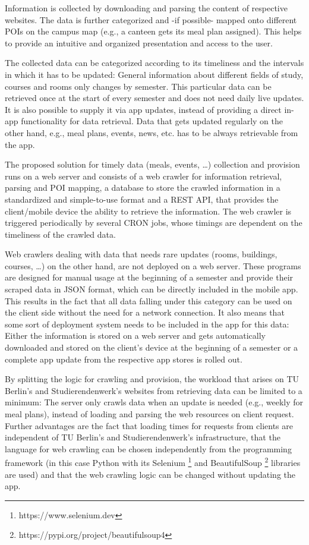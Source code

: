 Information is collected by downloading and parsing the content of respective websites. The data is further categorized and -if possible- mapped onto different POIs on the campus map (e.g., a canteen gets its meal plan assigned). This helps to provide an intuitive and organized presentation and access to the user.

The collected data can be categorized according to its timeliness and the intervals in which it has to be updated: General information about different fields of study, courses and rooms only changes by semester. This particular data can be retrieved once at the start of every semester and does not need daily live updates. It is also possible to supply it via app updates, instead of providing a direct in-app functionality for data retrieval. Data that gets updated regularly on the other hand, e.g., meal plans, events, news, etc. has to be always retrievable from the app.

The proposed solution for timely data (meals, events, \ldots) collection and provision runs on a web server and consists of a web crawler for information retrieval, parsing and POI mapping, a database to store the crawled information in a standardized and simple-to-use format and a REST API, that provides the client/mobile device the ability to retrieve the information. The web crawler is triggered periodically by several CRON jobs, whose timings are dependent on the timeliness of the crawled data.

Web crawlers dealing with data that needs rare updates (rooms, buildings, courses, \ldots) on the other hand, are not deployed on a web server. These programs are designed for manual usage at the beginning of a semester and provide their scraped data in JSON format, which can be directly included in the mobile app. This results in the fact that all data falling under this category can be used on the client side without the need for a network connection. It also means that some sort of deployment system needs to be included in the app for this data: Either the information is stored on a web server and gets automatically downloaded and stored on the client's device at the beginning of a semester or a complete app update from the respective app stores is rolled out.

By splitting the logic for crawling and provision, the workload that arises on TU Berlin's and Studierendenwerk's websites from retrieving data can be limited to a minimum: The server only crawls data when an update is needed (e.g., weekly for meal plans), instead of loading and parsing the web resources on client request. Further advantages are the fact that loading times for requests from clients are independent of TU Berlin's and Studierendenwerk's infrastructure, that the language for web crawling can be chosen independently from the programming framework (in this case Python with its Selenium \footnote{https://www.selenium.dev} and BeautifulSoup \footnote{https://pypi.org/project/beautifulsoup4} libraries are used) and that the web crawling logic can be changed without updating the app.

